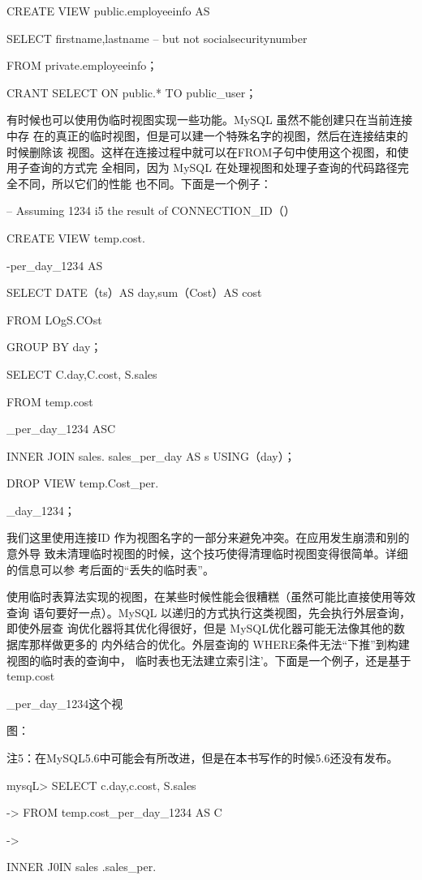 CREATE VIEW public.employeeinfo AS

SELECT firstname,lastname -- but not socialsecuritynumber

FROM private.employeeinfo；

CRANT SELECT ON public.* TO public\_user；

有时候也可以使用伪临时视图实现一些功能。MySQL 虽然不能创建只在当前连接中存
在的真正的临时视图，但是可以建一个特殊名字的视图，然后在连接结束的时候删除该
视图。这样在连接过程中就可以在FROM子句中使用这个视图，和使用子查询的方式完
全相同，因为 MySQL 在处理视图和处理子查询的代码路径完全不同，所以它们的性能
也不同。下面是一个例子：

-- Assuming 1234 i5 the result of CONNECTION\_ID（）

CREATE VIEW temp.cost.

-per\_day\_1234 AS

SELECT DATE（ts）AS day,sum（Cost）AS cost

FROM LOgS.COst

GROUP BY day；

SELECT C.day,C.cost, S.sales

FROM temp.cost

\_per\_day\_1234 ASC

INNER JOIN sales. sales\_per\_day AS s USING（day）；

DROP VIEW temp.Cost\_per.

\_day\_1234；

我们这里使用连接ID 作为视图名字的一部分来避免冲突。在应用发生崩溃和别的意外导
致未清理临时视图的时候，这个技巧使得清理临时视图变得很简单。详细的信息可以参
考后面的“丢失的临时表”。

使用临时表算法实现的视图，在某些时候性能会很糟糕（虽然可能比直接使用等效查询
语句要好一点）。MySQL 以递归的方式执行这类视图，先会执行外层查询，即使外层查
询优化器将其优化得很好，但是 MySQL优化器可能无法像其他的数据库那样做更多的
内外结合的优化。外层查询的 WHERE条件无法“下推”到构建视图的临时表的查询中，
临时表也无法建立索引注’。下面是一个例子，还是基于 temp.cost

\_per\_day\_1234这个视

图：

注5：在MySQL5.6中可能会有所改进，但是在本书写作的时候5.6还没有发布。

mysqL> SELECT c.day,c.cost, S.sales

-> FROM temp.cost\_per\_day\_1234 AS C

->

INNER J0IN sales .sales\_per.

